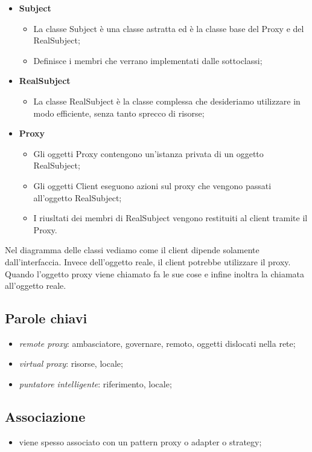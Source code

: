 \begin{itemize}
	\item \textbf{Subject}
	\begin{itemize}
		\item La classe Subject è una classe astratta ed è la classe base del Proxy e del RealSubject;
		\item Definisce i membri che verrano implementati dalle sottoclassi;
	\end{itemize}
	\item \textbf{RealSubject}
	\begin{itemize}
		\item La classe RealSubject è la classe complessa che desideriamo utilizzare in modo efficiente, senza tanto sprecco di risorse;
	\end{itemize}
		\item \textbf{Proxy}
	\begin{itemize}
		\item Gli oggetti Proxy contengono un'istanza privata di un oggetto RealSubject;
		\item Gli oggetti Client eseguono azioni sul proxy che vengono passati all'oggetto RealSubject;
		\item I riusltati dei membri di RealSubject vengono restituiti al client tramite il Proxy.
	\end{itemize}
	
\end{itemize}

Nel diagramma delle classi vediamo come il client dipende solamente dall'interfaccia. Invece dell'oggetto reale, il client potrebbe utilizzare il proxy. Quando l'oggetto proxy viene chiamato fa le sue cose e infine inoltra la chiamata all'oggetto reale.

\subsection{Parole chiavi}
\begin{itemize}
\item \textit{remote proxy}: ambasciatore, governare, remoto, oggetti dislocati nella rete;
\item \textit{virtual proxy}: risorse, locale;
\item \textit{puntatore intelligente}: riferimento, locale;
\end{itemize}

\subsection{Associazione}
\begin{itemize}
\item viene spesso associato con un pattern proxy o adapter o strategy;
\end{itemize}


